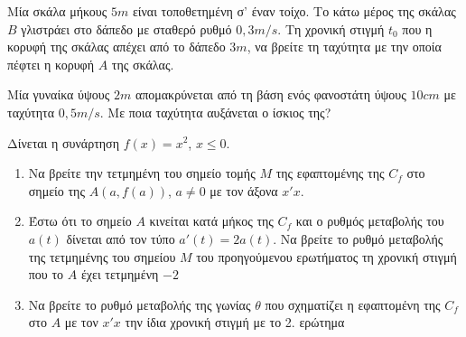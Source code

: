 \documentclass{presentation}
\begin{document}
\begin{askisi}
    Μία σκάλα μήκους $5m$ είναι τοποθετημένη σ' έναν τοίχο. Το κάτω μέρος της σκάλας $Β$ γλιστράει στο δάπεδο με σταθερό ρυθμό $0,3m/s$. Τη χρονική στιγμή $t_0$ που η κορυφή της σκάλας απέχει από το δάπεδο $3m$, να βρείτε τη ταχύτητα με την οποία πέφτει η κορυφή $Α$ της σκάλας.

\end{askisi}

\begin{askisi}
    Μία γυναίκα ύψους $2m$ απομακρύνεται από τη βάση ενός φανοστάτη ύψους $10cm$ με ταχύτητα $0,5m/s$. Με ποια ταχύτητα αυξάνεται ο ίσκιος της?

\end{askisi}

\begin{askisi}
    Δίνεται η συνάρτηση $f(x)=x^2$, $x\le 0$.
    \begin{enumerate}
        \item<1-> Να βρείτε την τετμημένη του σημείο τομής $Μ$ της εφαπτομένης της $C_f$ στο σημείο της $Α(a,f(a))$, $a\ne 0$ με τον άξονα $x'x$.
        \item<2-> Έστω ότι το σημείο $Α$ κινείται κατά μήκος της $C_f$ και ο ρυθμός μεταβολής του $a(t)$ δίνεται από τον τύπο $a'(t)=2a(t)$. Να βρείτε το ρυθμό μεταβολής της τετμημένης του σημείου $Μ$ του προηγούμενου ερωτήματος τη χρονική στιγμή που το $Α$ έχει τετμημένη $-2$
        \item<3-> Να βρείτε το ρυθμό μεταβολής της γωνίας $θ$ που σχηματίζει η εφαπτομένη της $C_f$ στο $Α$ με τον $x'x$ την ίδια χρονική στιγμή με το 2. ερώτημα
    \end{enumerate}

\end{askisi}
\end{document}
